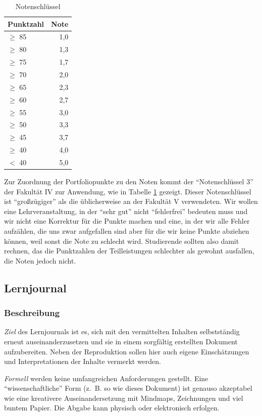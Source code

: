 \documentclass[DIV=15,headinclude]{scrartcl}
\begin{document}
\begin{table}
	\centering
	\caption{Notenschlüssel}
	\label{tab:notenschlüssel}
	\begin{tabular}{lr}
		\toprule
		Punktzahl & Note \\
		\midrule
		$\geq$ 85 & 1,0 \\
		$\geq$ 80 & 1,3 \\
		$\geq$ 75 & 1,7 \\
		$\geq$ 70 & 2,0 \\
		$\geq$ 65 & 2,3 \\
		$\geq$ 60 & 2,7 \\
		$\geq$ 55 & 3,0 \\
		$\geq$ 50 & 3,3 \\
		$\geq$ 45 & 3,7 \\
		$\geq$ 40 & 4,0 \\
		$<$ 40  & 5,0 \\
		\bottomrule
	\end{tabular}
\end{table}

Zur Zuordnung der Portfoliopunkte zu den Noten kommt der "`Notenschlüssel 3"' der Fakultät IV zur Anwendung, wie in Tabelle \ref{tab:notenschlüssel} gezeigt. Dieser Notenschlüssel ist "`großzügiger"' als die üblicherweise an der Fakultät V verwendeten. Wir wollen eine Lehrveranstaltung, in der "`sehr gut"' nicht "`fehlerfrei"' bedeuten muss und wir nicht eine Korrektur für die Punkte machen und eine, in der wir alle Fehler aufzählen, die uns zwar aufgefallen sind aber für die wir keine Punkte abziehen können, weil sonst die Note zu schlecht wird. Studierende sollten also damit rechnen, das die Punktzahlen der Teilleistungen schlechter als gewohnt ausfallen, die Noten jedoch nicht.

\subsection{Lernjournal}

\subsubsection{Beschreibung}
\emph{Ziel} des Lernjournals ist es, sich mit den vermittelten Inhalten selbstständig erneut auseinanderzusetzen und sie in einem sorgfältig erstellten Dokument aufzubereiten. Neben der Reproduktion sollen hier auch eigene Einschätzungen und Interpretationen der Inhalte vermerkt werden.

\emph{Formell} werden keine umfangreichen Anforderungen gestellt. Eine "`wissenschaftliche"' Form (z.~B. so wie dieses Dokument) ist genauso akzeptabel wie eine kreativere Auseinandersetzung mit Mindmaps, Zeichnungen und viel buntem Papier. Die Abgabe kann physisch oder elektronisch erfolgen.
\end{document}
